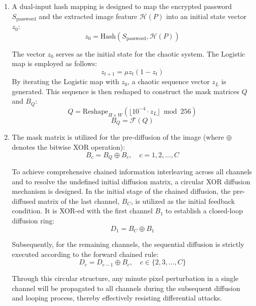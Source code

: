 \documentclass[a4paper,fleqn]{cas-dc}
\theoremstyle{plain}
\theoremstyle{definition}
\begin{document}
\begin{enumerate}
\item
A dual-input hash mapping is designed to map the encrypted password $S_{\text{password}}$ and the extracted image feature $\mathcal{H}(P)$ into an initial state vector $z_0$:
\begin{equation}
	z_0 = \text{Hash}(S_{\text{password}}, \mathcal{H}(P))
\end{equation}

The vector $z_0$ serves as the initial state for the chaotic system. The Logistic map is employed as follows:
\begin{equation}
	z_{t+1} = \mu z_t(1 - z_t)
\end{equation}
By iterating the Logistic map with $z_0$, a chaotic sequence vector $z_L$ is generated. This sequence is then reshaped to construct the mask matrices $Q$ and $B_Q$:
\begin{equation}
	Q = \text{Reshape}_{H \times W} \left( \lfloor 10^{-4} \cdot z_L \rfloor \bmod 256 \right)
\end{equation}
\begin{equation}
	B_Q = \mathcal{F}(Q)
\end{equation}

\item
The mask matrix is utilized for the pre-diffusion of the image (where $\oplus$ denotes the bitwise XOR operation):
\begin{equation}
	B_c = B_Q \oplus B_c, \quad c = 1, 2, \dots, C
\end{equation}

To achieve comprehensive chained information interleaving across all channels and to resolve the undefined initial diffusion matrix, a circular XOR diffusion mechanism is designed. In the initial stage of the chained diffusion, the pre-diffused matrix of the last channel, $B_C$, is utilized as the initial feedback condition. It is XOR-ed with the first channel $B_1$ to establish a closed-loop diffusion ring:
\begin{equation}
	D_1 = B_C \oplus B_1
\end{equation}

Subsequently, for the remaining channels, the sequential diffusion is strictly executed according to the forward chained rule:
\begin{equation}
	D_c = D_{c-1} \oplus B_c, \quad c \in \{2, 3, \dots, C\}
\end{equation}

Through this circular structure, any minute pixel perturbation in a single channel will be propagated to all channels during the subsequent diffusion and looping process, thereby effectively resisting differential attacks.


\end{enumerate}
\end{document}
